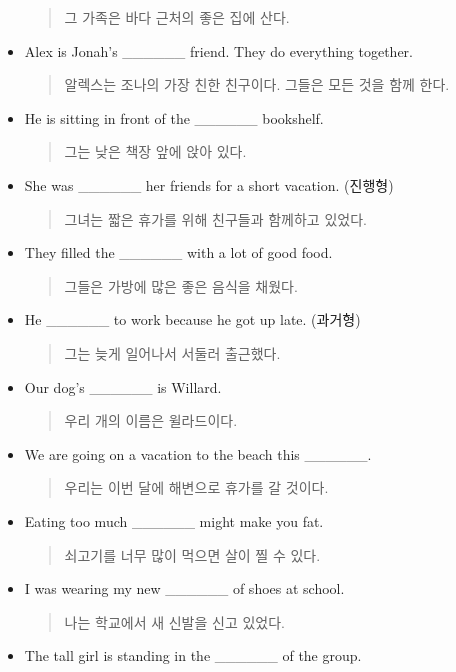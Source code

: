 \documentclass{article}
\begin{document}
\begin{addmargin}[1em]{1em}
\begin{itemize}
\begin{quote}
    그 가족은 바다 근처의 좋은 집에 산다.
    \end{quote}
    \item Alex is Jonah's \_\_\_\_\_\_ friend. They do everything together.
    \begin{quote}
    알렉스는 조나의 가장 친한 친구이다. 그들은 모든 것을 함께 한다.
    \end{quote}
    \item He is sitting in front of the \_\_\_\_\_\_ bookshelf.
    \begin{quote}
    그는 낮은 책장 앞에 앉아 있다.
    \end{quote}
    \item She was \_\_\_\_\_\_ her friends for a short vacation. (진행형)
    \begin{quote}
    그녀는 짧은 휴가를 위해 친구들과 함께하고 있었다.
    \end{quote}
    \item They filled the \_\_\_\_\_\_ with a lot of good food.
    \begin{quote}
    그들은 가방에 많은 좋은 음식을 채웠다.
    \end{quote}
    \item He \_\_\_\_\_\_ to work because he got up late. (과거형)
    \begin{quote}
    그는 늦게 일어나서 서둘러 출근했다.
    \end{quote}
    \item Our dog's \_\_\_\_\_\_ is Willard.
    \begin{quote}
    우리 개의 이름은 윌라드이다.
    \end{quote}
    \item We are going on a vacation to the beach this \_\_\_\_\_\_.
    \begin{quote}
    우리는 이번 달에 해변으로 휴가를 갈 것이다.
    \end{quote}
    \item Eating too much \_\_\_\_\_\_ might make you fat.
    \begin{quote}
    쇠고기를 너무 많이 먹으면 살이 찔 수 있다.
    \end{quote}
    \item I was wearing my new \_\_\_\_\_\_ of shoes at school.
    \begin{quote}
    나는 학교에서 새 신발을 신고 있었다.
    \end{quote}
    \item The tall girl is standing in the \_\_\_\_\_\_ of the group.
    \begin{quote}

\end{quote}
\end{itemize}
\end{addmargin}
\end{document}
